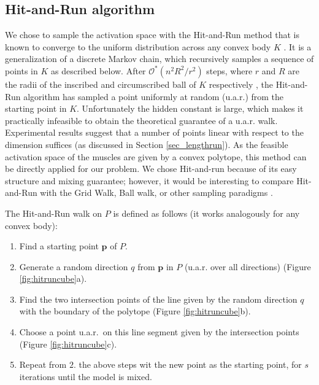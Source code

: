 \subsection*{Hit-and-Run algorithm}
\label{ss:hitrun}
We chose to sample the activation space with the Hit-and-Run method that is known to converge to the uniform distribution across any convex body $K$ \cite{smith1984efficient}.
It is a generalization of a discrete Markov chain, which recursively samples a sequence of points in $K$ as described below.
After $\mathcal{O}^*(n^2R^2/r^2)$ steps, where $r$ and $R$ are the radii of the inscribed and circumscribed ball of $K$ respectively \cite{Dyer, Lovasz}, the Hit-and-Run algorithm has sampled a point uniformly at random (u.a.r.) from the starting point in $K$.
Unfortunately the hidden constant is large, which makes it practically infeasible to obtain the theoretical guarantee of a u.a.r. walk.
Experimental results suggest that a number of points linear with respect to the dimension suffices (as discussed in Section \ref{sec_lengthrun}).
As the feasible activation space of the muscles are given by a convex polytope, this method can be directly applied for our problem.
We chose Hit-and-run because of its easy structure and mixing guarantee; however, it would be interesting to compare Hit-and-Run with the Grid Walk, Ball walk, or other sampling paradigms \cite{Vempala}.

The Hit-and-Run walk on $P$ is defined as follows (it works analogously for any convex body):
\begin{enumerate}
\item Find a starting point $\textbf{p}$ of $P$.
\item Generate a random direction $q$ from $\textbf{p}$ in $P$ (u.a.r. over all directions) (Figure \ref{fig:hitruncube}a).
\item Find the two intersection points of the line given by the random direction $q$ with the boundary of the polytope (Figure \ref{fig:hitruncube}b).
\item Choose a point u.a.r.\ on this line segment given by the intersection points (Figure \ref{fig:hitruncube}c). 
\item Repeat from $2.$ the above steps wit the new point as the starting point, for $s$ iterations until the model is mixed.
\end{enumerate}

